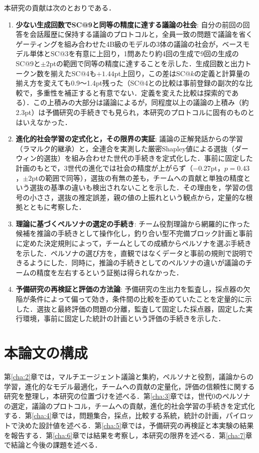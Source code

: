 本研究の貢献は次のとおりである．

\begin{enumerate}
\item \textbf{少ない生成回数でSC@9と同等の精度に達する議論の社会}: 自分の前回の回答を会話履歴に保持する議論のプロトコルと，全員一致の問題で議論を省くゲーティングを組み合わせた4B級のモデルの3体の議論の社会が，ベースモデル単体とSC@3を有意に上回り，1問あたり約4回の生成で9回の生成のSC@9と$\pm 2$ptの範囲で同等の精度に達することを示した．生成回数と出力トークン数を揃えたSC@4も$+1.44$pt上回り，この差はSC@$k$の定義と計算量の揃え方を変えても0.9〜1.4pt残った（SC@4との比較は事前登録の副次的な比較で，多重性を補正すると有意でない．定義を変えた比較は探索的である）．この上積みの大部分は議論によるが，同程度以上の議論の上積み（約2.3pt）は予備研究の手続きでも見られ，本研究のプロトコルに固有のものとはいえなかった．
\item \textbf{進化的社会学習の定式化と，その限界の実証}: 議論の正解発話からの学習（ラマルク的継承）と，全連合を実測した厳密Shapley値による選抜（ダーウィン的選抜）を組み合わせた世代の手続きを定式化した．事前に固定した計画のもとで，3世代の進化では社会の精度が上がらず（$-0.27$pt，$p = 0.43$，$\pm 2$ptの範囲で同等），選抜の有無の差も，チームへの貢献と単独の精度という選抜の基準の違いも検出されないことを示した．その理由を，学習の信号の小ささ，選抜の推定誤差，親の値の上振れという観点から，定量的な根拠とともに考察した．
\item \textbf{理論に基づくペルソナの選定の手続き}: チーム役割理論から網羅的に作った候補を推論の手続きとして操作化し，釣り合い型不完備ブロック計画と事前に定めた決定規則によって，チームとしての成績からペルソナを選ぶ手続きを示した．ペルソナの選び方を，直観ではなくデータと事前の規則で説明できるようにした．同時に，推論の手続きとしてのペルソナの違いが議論のチームの精度を左右するという証拠は得られなかった．
\item \textbf{予備研究の再検証と評価の方法論}: 予備研究の生出力を監査し，採点器の欠陥が条件によって偏って効き，条件間の比較を歪めていたことを定量的に示した．選抜と最終評価の問題の分離，監査して固定した採点器，固定した実行環境，事前に固定した統計の計画という評価の手続きを示した．
\end{enumerate}

\section{本論文の構成}
\label{sec:1.6}

第\ref{cha:2}章では，マルチエージェント議論と集約，ペルソナと役割，議論からの学習，進化的なモデル最適化，チームへの貢献の定量化，評価の信頼性に関する研究を整理し，本研究の位置づけを述べる．第\ref{cha:3}章では，世代0のペルソナの選定，議論のプロトコル，チームへの貢献，進化的社会学習の手続きを定式化する．第\ref{cha:4}章では，問題集合，採点，比較する系統，統計の計画，パイロットで決めた設計値を述べる．第\ref{cha:5}章では，予備研究の再検証と本実験の結果を報告する．第\ref{cha:6}章では結果を考察し，本研究の限界を述べる．第\ref{cha:7}章で結論と今後の課題を述べる．
